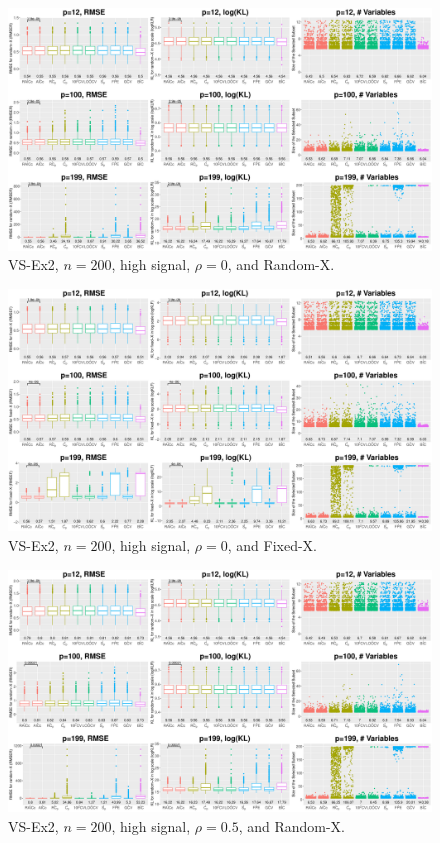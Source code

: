 \clearpage
\begin{figure}[!ht]
\centering
\includegraphics[width=\textwidth]{figures/supplement/randomx_VS-Ex2_n200_hsnr_rho0.eps}
\caption{VS-Ex2, $n=200$, high signal, $\rho=0$, and Random-X.}
\end{figure}
\begin{figure}[!ht]
\centering
\includegraphics[width=\textwidth]{figures/supplement/fixedx_VS-Ex2_n200_hsnr_rho0.eps}
\caption{VS-Ex2, $n=200$, high signal, $\rho=0$, and Fixed-X.}
\end{figure}
\clearpage
\begin{figure}[!ht]
\centering
\includegraphics[width=\textwidth]{figures/supplement/randomx_VS-Ex2_n200_hsnr_rho05.eps}
\caption{VS-Ex2, $n=200$, high signal, $\rho=0.5$, and Random-X.}
\end{figure}
